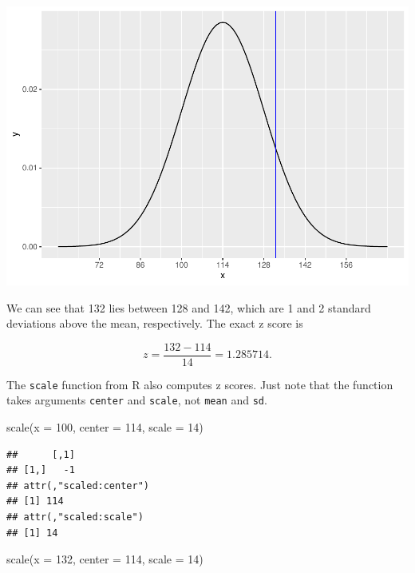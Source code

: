 \documentclass[
]{book}
\newenvironment{Shaded}{\begin{snugshade}}{\end{snugshade}}
\newcommand{\AttributeTok}[1]{\textcolor[rgb]{0.77,0.63,0.00}{#1}}
\newcommand{\DecValTok}[1]{\textcolor[rgb]{0.00,0.00,0.81}{#1}}
\newcommand{\FunctionTok}[1]{\textcolor[rgb]{0.00,0.00,0.00}{#1}}
\newcommand{\NormalTok}[1]{#1}
\begin{document}
\includegraphics{intro_stats_files/figure-latex/unnamed-chunk-353-1.pdf}

We can see that 132 lies between 128 and 142, which are 1 and 2 standard deviations above the mean, respectively. The exact z score is

\[
z = \frac{132 - 114}{14} = 1.285714.
\]

The \texttt{scale} function from R also computes z scores. Just note that the function takes arguments \texttt{center} and \texttt{scale}, not \texttt{mean} and \texttt{sd}.

\begin{Shaded}
\begin{Highlighting}[]
\FunctionTok{scale}\NormalTok{(}\AttributeTok{x =} \DecValTok{100}\NormalTok{, }\AttributeTok{center =} \DecValTok{114}\NormalTok{, }\AttributeTok{scale =} \DecValTok{14}\NormalTok{)}
\end{Highlighting}
\end{Shaded}

\begin{verbatim}
##      [,1]
## [1,]   -1
## attr(,"scaled:center")
## [1] 114
## attr(,"scaled:scale")
## [1] 14
\end{verbatim}

\begin{Shaded}
\begin{Highlighting}[]
\FunctionTok{scale}\NormalTok{(}\AttributeTok{x =} \DecValTok{132}\NormalTok{, }\AttributeTok{center =} \DecValTok{114}\NormalTok{, }\AttributeTok{scale =} \DecValTok{14}\NormalTok{)}
\end{Highlighting}
\end{Shaded}
\end{document}
